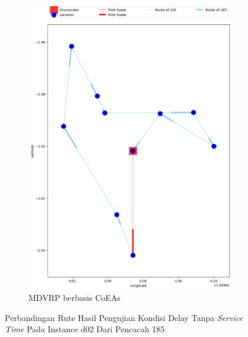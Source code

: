 \begin{figure}[H]
	\centering
	\begin{subfigure}[t]{\textwidth}
		\centering
		\includegraphics[width=\textwidth]{Resources/Images/delayed_2/real_m15_n100_delayed_2_185_coes}
		\caption{MDVRP berbasis CoEAs}
		\label{fig:real_m15_n100_delayed_2_185_coes}
	\end{subfigure}
	\caption{Perbandingan Rute Hasil Pengujian Kondisi Delay Tanpa \textit{Service Time} Pada Instance d02 Dari Pencacah 185}
	\label{fig:real_m15_n100_delayed_2_185}
\end{figure}


